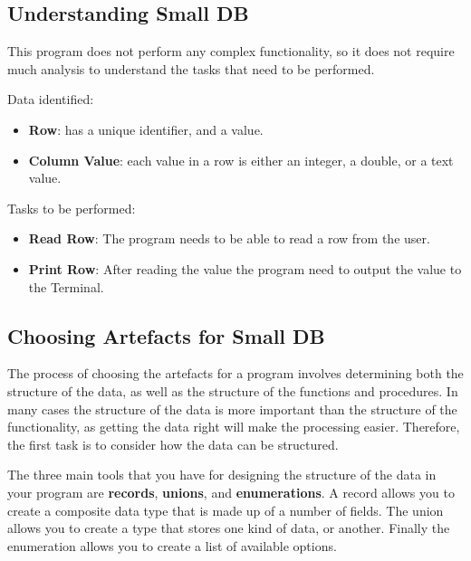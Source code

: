 
\subsection{Understanding Small DB} %
\label{sub:understanding_small_db}

This program does not perform any complex functionality, so it does not require much analysis to understand the tasks that need to be performed.

Data identified:
\begin{itemize}
  \item \textbf{Row}: has a unique identifier, and a value.
  \item \textbf{Column Value}: each value in a row is either an integer, a double, or a text value.
\end{itemize}

Tasks to be performed:
\begin{itemize}
  \item \textbf{Read Row}: The program needs to be able to read a row from the user.
  \item \textbf{Print Row}: After reading the value the program need to output the value to the Terminal.
\end{itemize}

\clearpage
\subsection{Choosing Artefacts for Small DB} %
\label{sub:choosing_artefacts_for_small_db}

The process of choosing the artefacts for a program involves determining both the structure of the data, as well as the structure of the functions and procedures. In many cases the structure of the data is more important than the structure of the functionality, as getting the data right will make the processing easier. Therefore, the first task is to consider how the data can be structured.

The three main tools that you have for designing the structure of the data in your program are \textbf{records}, \textbf{unions}, and \textbf{enumerations}. A record allows you to create a composite data type that is made up of a number of fields. The union allows you to create a type that stores one kind of data, or another. Finally the enumeration allows you to create a list of available options.

